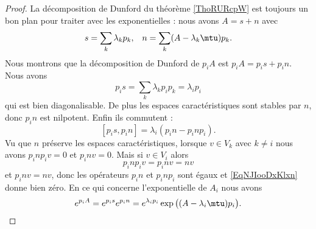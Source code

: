 \begin{proof}
    La décomposition de Dunford du théorème \ref{ThoRURcpW} est toujours un bon plan pour traiter avec les exponentielles : nous avons \( A=s+n\) avec
    \begin{equation}
        \begin{aligned}[]
            s&=\sum_k\lambda_kp_k,&n=\sum_k(A-\lambda_k\mtu)p_k.
        \end{aligned}
    \end{equation}
    Nous montrons que la décomposition de Dunford de \( p_iA\) est \( p_iA=p_is+p_in\). Nous avons
    \begin{equation}
        p_is=\sum_k\lambda_kp_ip_k=\lambda_ip_i
    \end{equation}
    qui est bien diagonalisable. De plus les espaces caractéristiques sont stables par \( n\), donc \( p_in\) est nilpotent. Enfin ils commutent :
    \begin{equation}    \label{EqNJIooDxKlxn}
        [p_is,p_in]=\lambda_i(p_in-p_inp_i).
    \end{equation}
    Vu que \( n\) préserve les espaces caractéristiques, lorsque \( v\in V_k\) avec \( k\neq i\) nous avons \( p_inp_iv=0\) et \( p_inv=0\). Mais si \( v\in V_i\) alors
    \begin{equation}
        p_inp_iv=p_inv=nv
    \end{equation}
    et \( p_inv=nv\), donc les opérateurs \( p_in\) et \( p_inp_i\) sont égaux et \eqref{EqNJIooDxKlxn} donne bien zéro. En ce qui concerne l'exponentielle de \( A_i\) nous avons
    \begin{equation}
        e^{p_iA}= e^{p_is} e^{p_in}= e^{\lambda_ip_i} \exp\big( (A-\lambda_i\mtu)p_i\big).
    \end{equation}


\end{proof}
